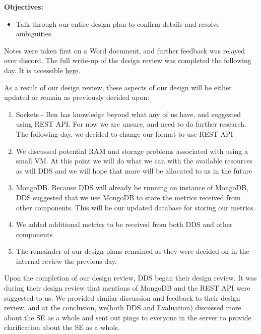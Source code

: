 \medskip

\textbf{Objectives:}
\begin{itemize}
  \item Talk through our entire design plan to confirm details and resolve ambiguities. 
\end{itemize}

Notes were taken first on a Word document, and further feedback was relayed over discord. The full write-up of the design review was completed the following day. It is accessible \href{https://docs.google.com/document/d/1REwOedsmrtoQbACQpFj3Ti8JiCDlrIysBp8OR26vRdU/edit?tab=t.0}{here}.

\medskip

As a result of our design review, these aspects of our design will be either updated or remain as previously decided upon:
\begin{enumerate}
  \item Sockets - Ben has knowledge beyond what any of us have, and suggested using REST API. For now we are unsure, and need to do further research. The following day, we decided to change our format to use REST API
  \item We discussed potential RAM and storage problems associated with using a small VM. At this point we will do what we can with the available resources as will DDS and we will hope that more will be allocated to us in the future
  \item MongoDB. Because DDS will already be running an instance of MongoDB, DDS suggested that we use MongoDB to store the metrics received from other components. This will be our updated database for storing our metrics. 
  \item We added additional metrics to be received from both DDS and other components
  \item The remainder of our design plans remained as they were decided on in the internal review the previous day.
\end{enumerate}
Upon the completion of our design review, DDS began their design review. It was during their design review that mentions of MongoDB and the REST API were suggested to us. We provided similar discussion and feedback to their design review, and at the conclusion, we(both DDS and Evaluation) discussed more about the SE as a whole and sent out pings to everyone in the server to provide clarification about the SE as a whole.
